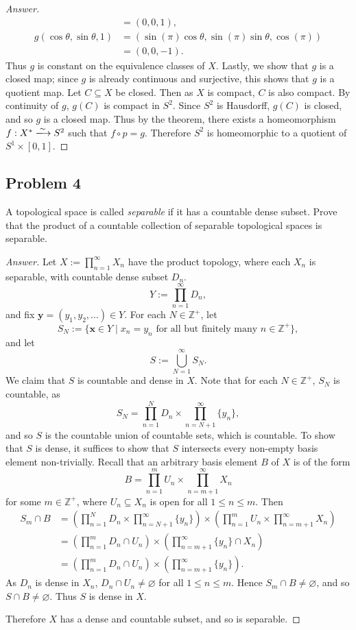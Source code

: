 \documentclass[12pt]{article}
\newcommand{\z}{\mathbb{Z}}
\newcommand{\ita}[1]{\textit{#1}}
\newcommand\paren[1]{\left( #1 \right)}
\theoremstyle{definition}
\begin{document}
\begin{proof}[Answer]
\begin{align*}
        & = (0,0,1), \\
        g \paren{ \cos \theta , \sin \theta , 1 } & = \paren{ \sin \paren{ \pi } \cos \theta , \sin \paren{\pi} \sin \theta , \cos \paren{\pi} } \\
        & = (0,0,-1).
    \end{align*}
    Thus $g$ is constant on the equivalence classes of $X$. Lastly, we show that $g$ is a closed map; since $g$ is already continuous and surjective, this shows that $g$ is a quotient map. Let $C \subseteq X$ be closed. Then as $X$ is compact, $C$ is also compact. By continuity of $g$, $g(C)$ is compact in $S^2$. Since $S^2$ is Hausdorff, $g(C)$ is closed, and so $g$ is a closed map. Thus by the theorem, there exists a homeomorphism $f : X^* \xlongrightarrow{\sim} S^2$ such that $f \circ p = g$. Therefore $S^2$ is homeomorphic to a quotient of $S^1 \times [0,1]$.
\end{proof}
\subsection{Problem 4}
A topological space is called \ita{separable} if it has a countable dense subset. Prove that the product of a countable collection of separable topological spaces is separable.
\begin{proof}[Answer]
    Let $X := \prod\limits_{n = 1}^{\infty} X_n$ have the product topology, where each $X_n$ is separable, with countable dense subset $D_n$. 
    \[Y:=\prod\limits_{n=1}^{\infty}D_n,\]
    and fix $\mathbf{y}=(y_1,y_2,\dotsc)\in Y$. For each $N\in\z^+$, let 
    \[S_N:=\{\mathbf{x}\in Y\mid x_n=y_n\text{ for all but finitely many }n\in\z^+\},\]
    and let 
    \[S:=\bigcup\limits_{N=1}^{\infty}S_N.\]
    We claim that $S$ is countable and dense in $X$. Note that for each $N\in\z^+$, $S_N$ is countable, as
    \[S_N=\prod\limits_{n=1}^ND_n\times\prod\limits_{n=N+1}^{\infty}\{y_n\},\]
    and so $S$ is the countable union of countable sets, which is countable. To show that $S$ is dense, it suffices to show that $S$ intersects every non-empty basis element non-trivially. Recall that an arbitrary basis element $B$ of $X$ is of the form
    \[B=\prod\limits_{n=1}^mU_n\times\prod\limits_{n=m+1}^{\infty}X_n\]
    for some $m\in\z^+$, where $U_n\subseteq X_n$ is open for all $1\leq n\leq m$. Then
    \begin{align*}
        S_m\cap B&=\left(\prod\limits_{n=1}^ND_n\times\prod\limits_{n=N+1}^{\infty}\{y_n\}\right)\times\left(\prod\limits_{n=1}^mU_n\times\prod\limits_{n=m+1}^{\infty}X_n\right)\\
        &=\left(\prod\limits_{n=1}^m D_n\cap U_n\right)\times\left(\prod\limits_{n=m+1}^{\infty}\{y_n\}\cap X_n\right) \\
        &=\left(\prod\limits_{n=1}^m D_n\cap U_n\right)\times\left(\prod\limits_{n=m+1}^{\infty}\{y_n\}\right).
    \end{align*}
    As $D_n$ is dense in $X_n$, $D_n\cap U_n\neq\varnothing$ for all $1\leq n\leq m$. Hence $S_m\cap B\neq\varnothing$, and so $S\cap B\neq\varnothing$. Thus $S$ is dense in $X$.
    
    Therefore $X$ has a dense and countable subset, and so is separable.
\end{proof}
\end{document}

